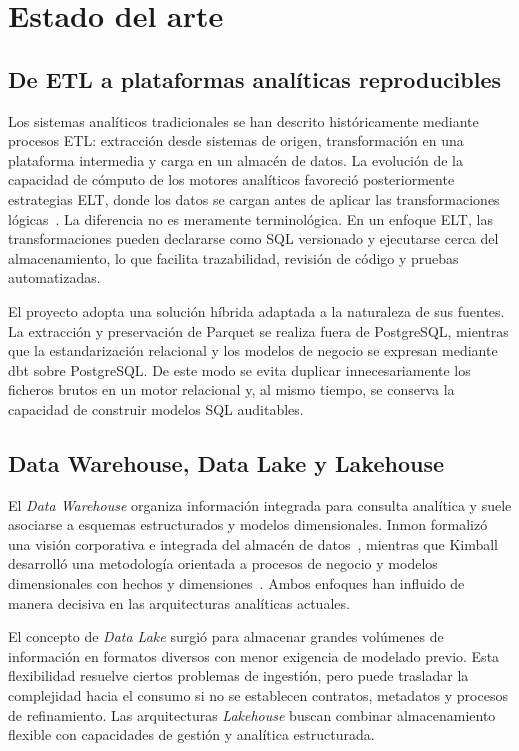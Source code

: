 \chapter{Estado del arte}\label{chap:estadoarte}

\section{De ETL a plataformas analíticas reproducibles}

Los sistemas analíticos tradicionales se han descrito históricamente mediante procesos ETL\@: extracción desde sistemas de origen, transformación en una plataforma intermedia y carga en un almacén de datos. La evolución de la capacidad de cómputo de los motores analíticos favoreció posteriormente estrategias ELT, donde los datos se cargan antes de aplicar las transformaciones lógicas~\cite{vassiliadis2009}. La diferencia no es meramente terminológica. En un enfoque ELT, las transformaciones pueden declararse como SQL versionado y ejecutarse cerca del almacenamiento, lo que facilita trazabilidad, revisión de código y pruebas automatizadas.

El proyecto adopta una solución híbrida adaptada a la naturaleza de sus fuentes. La extracción y preservación de Parquet se realiza fuera de PostgreSQL, mientras que la estandarización relacional y los modelos de negocio se expresan mediante dbt sobre PostgreSQL\@. De este modo se evita duplicar innecesariamente los ficheros brutos en un motor relacional y, al mismo tiempo, se conserva la capacidad de construir modelos SQL auditables.

\section{Data Warehouse, Data Lake y Lakehouse}

El \textit{Data Warehouse} organiza información integrada para consulta analítica y suele asociarse a esquemas estructurados y modelos dimensionales. Inmon formalizó una visión corporativa e integrada del almacén de datos~\cite{inmon2005}, mientras que Kimball desarrolló una metodología orientada a procesos de negocio y modelos dimensionales con hechos y dimensiones~\cite{kimball2013}. Ambos enfoques han influido de manera decisiva en las arquitecturas analíticas actuales.

El concepto de \textit{Data Lake} surgió para almacenar grandes volúmenes de información en formatos diversos con menor exigencia de modelado previo. Esta flexibilidad resuelve ciertos problemas de ingestión, pero puede trasladar la complejidad hacia el consumo si no se establecen contratos, metadatos y procesos de refinamiento. Las arquitecturas \textit{Lakehouse} buscan combinar almacenamiento flexible con capacidades de gestión y analítica estructurada.

